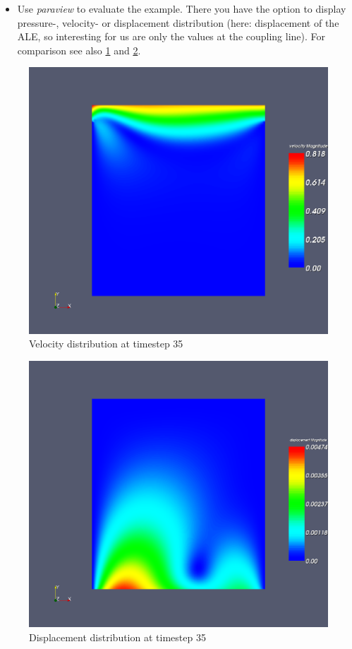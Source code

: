 \begin{itemize}
\item Use \emph{paraview} to evaluate the example. There you have the option
to display pressure-, velocity- or displacement distribution (here:
displacement of the ALE, so interesting for us are only the values
at the coupling line). For comparison see also \ref{tut_fsi:5.3} and
\ref{tut_fsi:5.4}.
\end{itemize}
%
\begin{figure}[h]
\includegraphics[scale=0.4]{Bilder/fsi_03}


\caption{\label{tut_fsi:5.3} Velocity distribution at timestep 35}
\end{figure}


%
\begin{figure}[h]
\includegraphics[scale=0.4]{Bilder/fsi_04}


\caption{\label{tut_fsi:5.4} Displacement distribution at timestep 35}
\end{figure}
